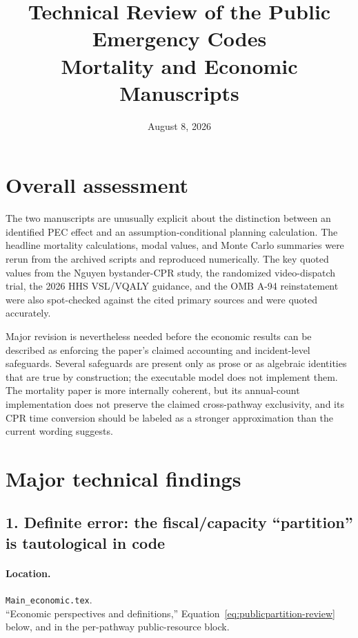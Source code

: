 \documentclass[11pt]{article}
\title{Technical Review of the Public Emergency Codes\\
Mortality and Economic Manuscripts}
\author{}
\date{August 8, 2026}
\begin{document}
\maketitle

\section*{Overall assessment}

The two manuscripts are unusually explicit about the distinction between an
identified PEC effect and an assumption-conditional planning calculation.  The
headline mortality calculations, modal values, and Monte Carlo summaries were
rerun from the archived scripts and reproduced numerically.  The key quoted
values from the Nguyen bystander-CPR study, the randomized video-dispatch
trial, the 2026 HHS VSL/VQALY guidance, and the OMB A-94 reinstatement were also
spot-checked against the cited primary sources and were quoted accurately.

Major revision is nevertheless needed before the economic results can be
described as enforcing the paper's claimed accounting and incident-level
safeguards.  Several safeguards are present only as prose or as algebraic
identities that are true by construction; the executable model does not
implement them.  The mortality paper is more internally coherent, but its
annual-count implementation does not preserve the claimed cross-pathway
exclusivity, and its CPR time conversion should be labeled as a stronger
approximation than the current wording suggests.

\section*{Major technical findings}

\subsection*{1. Definite error: the fiscal/capacity ``partition'' is tautological in code}

\paragraph{Location.}
\texttt{Main\_economic.tex}.\\
``Economic perspectives and definitions,''
Equation~\eqref{eq:publicpartition-review} below, and
 in the per-pathway public-resource block.
\end{document}
